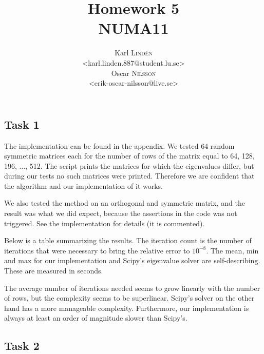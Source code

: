 \documentclass[a4paper,12pt]{article}
\begin{document}
\title{Homework 5 \\ NUMA11}
\author{
  Karl \textsc{Lind\'{e}n} \\
  <karl.linden.887@student.lu.se> \\
  Oscar \textsc{Nilsson} \\
  <erik-oscar-nilsson@live.se>
}

\maketitle
\thispagestyle{empty}

\newpage


\subsection*{Task 1}

The implementation can be found in the appendix.
We tested 64 random symmetric matrices each for the number of rows of the matrix
equal to 64, 128, 196, \(\dots\), 512.
The script prints the matrices for which the eigenvalues differ, but during our
tests no such matrices were printed.
Therefore we are confident that the algorithm and our implementation of it
works.

We also tested the method on an orthogonal and symmetric matrix, and the result
was what we did expect, because the assertions in the code was not triggered.
See the implementation for details (it is commented).

Below is a table summarizing the results.
The iteration count is the number of iterations that were necessary to bring the
relative error to \(10^{-8}\).
The mean, min and max for our implementation and Scipy's eigenvalue solver are
self-describing.
These are measured in seconds.

The average number of iterations needed seems to grow linearly with the number
of rows, but the complexity seems to be superlinear.
Scipy's solver on the other hand has a more manageable complexity.
Furthermore, our implementation is always at least an order of magnitude slower
than Scipy's.

\begin{landscape}
  
\end{landscape}


\subsection*{Task 2}
\end{document}
